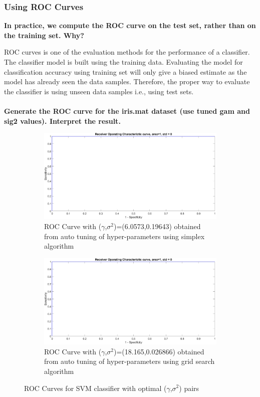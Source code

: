 \documentclass[12pt]{report}
\begin{document}
{\subsubsection{Using ROC Curves}
\textbf{ In practice, we compute the ROC curve on the test set, rather than on the training set. Why?}

ROC curves is one of the evaluation methods for the performance of a classifier. The classifier model is built using the training data. Evaluating the model for classification accuracy using training set will only give a biased estimate as the model has already seen the data samples. Therefore, the proper way to evaluate the classifier is using unseen data samples i.e., using test sets.\\\\
\textbf{Generate the ROC curve for the iris.mat dataset (use tuned gam and sig2 values). Interpret the result.}
\begin{figure}[!ht]
	\begin{subfigure}{0.5\linewidth}
		\centering
		\captionsetup{width=.8\linewidth}
		\includegraphics[width=0.8\linewidth]{Ex1.3_ROC_simplex}
		\caption{ROC Curve with ($\gamma$,$\sigma^2$)=(6.0573,0.19643) obtained from auto tuning of hyper-parameters using simplex algorithm}
		\label{fig:ROC_simplex}\par\vfill
	\end{subfigure}%
	\begin{subfigure}{0.5\linewidth}
		\centering
		\captionsetup{width=.8\linewidth}
		\includegraphics[width=0.8\linewidth]{EX1.3_ROC_grid.jpg}
		\caption{ROC Curve with ($\gamma$,$\sigma^2$)=(18.165,0.026866) obtained from auto tuning of hyper-parameters using grid search algorithm}
		\label{fig:ROC_grid}
	\end{subfigure}
	\caption{ROC Curves for SVM classifier with optimal ($\gamma$,$\sigma^2$) pairs}
	\label{fig:ROC}
\end{figure}

}
\end{document}
